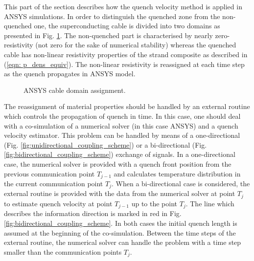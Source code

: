 
This part of the section describes how the quench velocity method is applied in ANSYS simulations. In order to distinguish the quenched zone from the non-quenched one, the superconducting cable is divided into two domains as presented in Fig. \ref{fig:ansys_material_assignment}. The non-quenched part is characterised by nearly zero-resistivity (not zero for the sake of numerical stability) whereas the quenched cable has non-linear resistivity properties of the strand composite as described in (\ref{eqn: p_dens_equiv}). The non-linear resistivity is reassigned at each time step as the quench propagates in ANSYS model.

\begin{figure}[H]
\centering
{}
\caption{ANSYS cable domain assignment.}
    \label{fig:ansys_material_assignment}
\end{figure}

The reassignment of material properties should be handled by an external routine which controls the propagation of quench in time. In this case, one should deal with a co-simulation of a numerical solver (in this case ANSYS) and a quench velocity estimator. This problem can be handled by means of a one-directional (Fig. \ref{fig:unidirectional_coupling_scheme}) or a bi-directional (Fig. \ref{fig:bidirectional_coupling_scheme}) exchange of signals. In a one-directional case, the numerical solver is provided with a quench front position from the previous communication point $T_{j-1}$ and calculates temperature distribution in the current communication point $T_j$. When a bi-directional case is considered, the external routine is provided with the data from the numerical solver at point $T_j$ to estimate quench velocity at point $T_{j-1}$ up to the point $T_j$. The line which describes the information direction is marked in red in Fig. \ref{fig:bidirectional_coupling_scheme}. In both cases the initial quench length is assumed at the beginning of the co-simulation. Between the time steps of the external routine, the numerical solver can handle the problem with a time step smaller than the communication points $T_j$.

